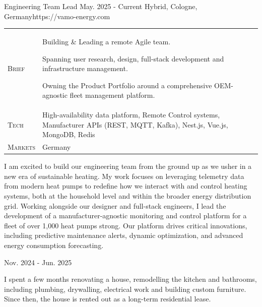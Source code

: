 \documentclass[10pt,a4paper]{moderncv}
\begin{document}
\clearpage
{}

    {Engineering Team Lead}
    {May. 2025 - Current}
    {Hybrid, Cologne, Germany}{https://vamo-energy.com}

  \begin{tabularx}{\textwidth}{>{\scshape}l@{\hskip 3.5mm}L}
    Brief & Building \& Leading a remote Agile team.
    \par Spanning user research, design, full-stack development and infrastructure management.
    \par Owning the Product Portfolio around a comprehensive OEM-agnostic fleet management platform.\\
    Tech & High-availability data platform, Remote Control systems, Manufacturer APIs (REST, MQTT, Kafka),  Nest.js, Vue.js, MongoDB, Redis\\
    Markets & Germany\\
  \end{tabularx}

  \vspace{1.5em}

  \begin{minipage}{\textwidth}
    \small
    I am excited to build our engineering team from the ground up as we usher in a new era of sustainable heating. My work focuses on leveraging telemetry data from modern heat pumps to redefine how we interact with and control heating systems, both at the household level and within the broader energy distribution grid. Working alongside our designer and full-stack engineers, I lead the development of a manufacturer-agnostic monitoring and control platform for a fleet of over 1,000 heat pumps strong. Our platform drives critical innovations, including predictive maintenance alerts, dynamic optimization, and advanced energy consumption forecasting.
  \end{minipage}
  
  \vspace{1.5em}
  
    {}
    {Nov. 2024 - Jun. 2025}
    {}{}

  \begin{minipage}{\textwidth}
    \small
    I spent a few months renovating a house, remodelling the kitchen and bathrooms, including plumbing, drywalling, electrical work and building custom furniture. Since then, the house is rented out as a long-term residential lease.
  \end{minipage}
  
\end{document}
